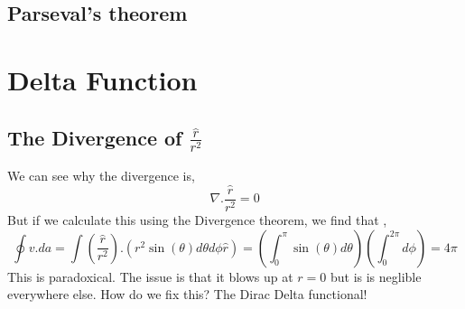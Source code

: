 \subsection{Parseval’s theorem}
\section{Delta Function}
\subsection{The Divergence of $\frac{\hat{r}}{r^{2}}$}
We can see why the divergence is,
\begin{equation}
\nabla . \frac{\hat{r}}{r^{2}} = 0
\end{equation}
But if we calculate this using the Divergence theorem, we find that ,
\begin{equation}
	\oint v .da = \int \left( \frac{\hat{r}}{r^{2}} \right) . \left( r^{2} \sin(\theta) d \theta d \phi \hat{r} \right) = \left( \int_{0}^{\pi} \sin(\theta) d \theta \right) \left( \int_{0}^{2\pi} d \phi \right) = 4 \pi
\end{equation}
This is paradoxical. The issue is that it blows up at $r=0$ but is is neglible everywhere else. How do we fix this? The Dirac Delta functional!
